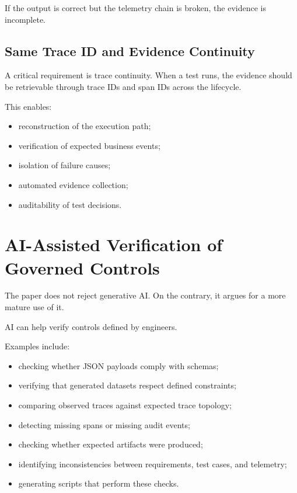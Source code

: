 \documentclass[11pt,a4paper]{article}
\begin{document}
If the output is correct but the telemetry chain is broken, the evidence is incomplete.

\subsection{Same Trace ID and Evidence Continuity}

A critical requirement is trace continuity. When a test runs, the evidence should be retrievable through trace IDs and span IDs across the lifecycle.

This enables:
\begin{itemize}
\item reconstruction of the execution path;
\item verification of expected business events;
\item isolation of failure causes;
\item automated evidence collection;
\item auditability of test decisions.
\end{itemize}

\section{AI-Assisted Verification of Governed Controls}

The paper does not reject generative AI. On the contrary, it argues for a more mature use of it.

AI can help verify controls defined by engineers.

Examples include:
\begin{itemize}
\item checking whether JSON payloads comply with schemas;
\item verifying that generated datasets respect defined constraints;
\item comparing observed traces against expected trace topology;
\item detecting missing spans or missing audit events;
\item checking whether expected artifacts were produced;
\item identifying inconsistencies between requirements, test cases, and telemetry;
\item generating scripts that perform these checks.
\end{itemize}
\end{document}
